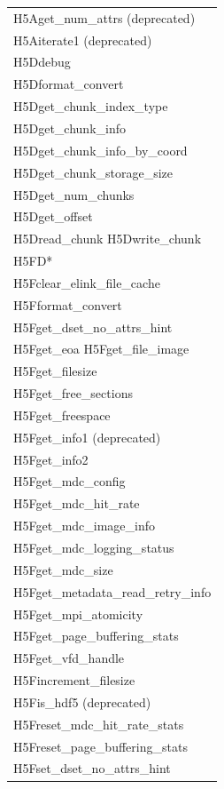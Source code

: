 \begin{longtable}{ |>{\raggedright\arraybackslash}p{\linewidth}| }
    \hline
    H5Aget\_num\_attrs (deprecated) \\
    H5Aiterate1 (deprecated) \\
    \hline
    H5Ddebug \\
    H5Dformat\_convert \\
    H5Dget\_chunk\_index\_type \\
    H5Dget\_chunk\_info \\
    H5Dget\_chunk\_info\_by\_coord \\
    H5Dget\_chunk\_storage\_size \\
    H5Dget\_num\_chunks \\
    H5Dget\_offset \\
    H5Dread\_chunk H5Dwrite\_chunk \\
    \hline
    H5FD* \\
    \hline
    H5Fclear\_elink\_file\_cache \\
    H5Fformat\_convert \\
    H5Fget\_dset\_no\_attrs\_hint \\
    H5Fget\_eoa H5Fget\_file\_image \\
    H5Fget\_filesize \\
    H5Fget\_free\_sections \\
    H5Fget\_freespace \\
    H5Fget\_info1 (deprecated) \\
    H5Fget\_info2 \\
    H5Fget\_mdc\_config \\
    H5Fget\_mdc\_hit\_rate \\
    H5Fget\_mdc\_image\_info \\
    H5Fget\_mdc\_logging\_status \\
    H5Fget\_mdc\_size \\
    H5Fget\_metadata\_read\_retry\_info \\
    H5Fget\_mpi\_atomicity \\
    H5Fget\_page\_buffering\_stats \\
    H5Fget\_vfd\_handle \\
    H5Fincrement\_filesize \\
    H5Fis\_hdf5 (deprecated) \\
    H5Freset\_mdc\_hit\_rate\_stats \\
    H5Freset\_page\_buffering\_stats \\
    H5Fset\_dset\_no\_attrs\_hint \\

\end{longtable}
